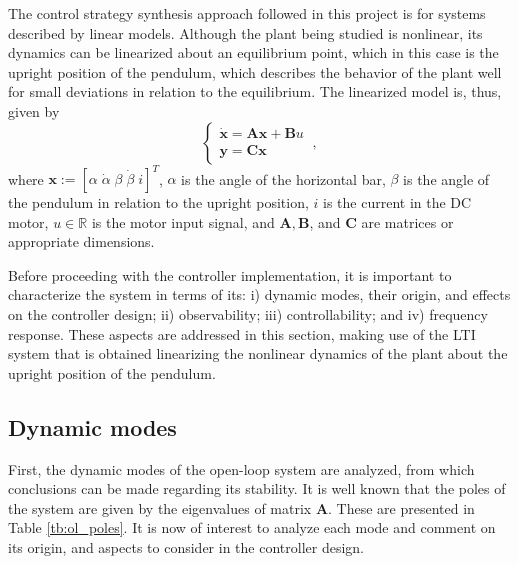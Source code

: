 \documentclass[letterpaper, 10 pt, conference]{ieeeconf}
\begin{document}
The control strategy synthesis approach followed in this project is for systems described by linear models. Although the plant being studied is nonlinear, its dynamics can be linearized about an equilibrium point, which in this case is the upright position of the pendulum, which describes the behavior of the plant well for small deviations in relation to the equilibrium. The linearized model is, thus, given by
\begin{equation*}
\begin{cases}
    \dot{\mathbf{x}} = \mathbf{Ax}+\mathbf{B}u\\
    \mathbf{y} = \mathbf{Cx}
    \end{cases}\:,
\end{equation*}
where $\mathbf{x}:= [\alpha\;\dot{\alpha}\;\beta\;\dot{\beta}\;i]^T$, $\alpha$ is the angle of the horizontal bar, $\beta$ is the angle of the pendulum in relation to the upright position, $i$ is the current in the DC motor, $u\in \mathbb{R}$ is the motor input signal, and $\mathbf{A},\mathbf{B}$, and $\mathbf{C}$ are matrices or appropriate dimensions. 

Before proceeding with the controller implementation, it is important to characterize the system in terms of its: i) dynamic modes, their origin, and effects on the controller design; ii) observability; iii) controllability; and iv) frequency response. These aspects are addressed in this section, making use of the LTI system that is obtained linearizing the nonlinear dynamics of the plant about the upright position of the pendulum.

\subsection{Dynamic modes}\label{sec:dynModes}
First, the dynamic modes of the open-loop system are analyzed, from which conclusions can be made regarding its stability. It is well known that the poles of the system are given by the eigenvalues of matrix $\mathbf{A}$. These are presented in Table \ref{tb:ol_poles}. It is now of interest to analyze each mode and comment on its origin, and aspects to consider in the controller design.
\end{document}

